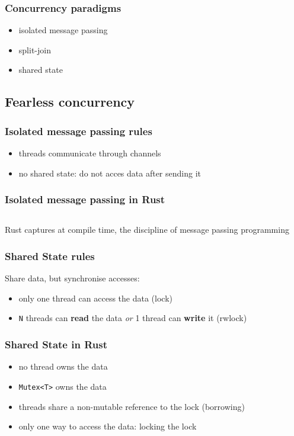 \documentclass{beamer}
\begin{document}
\begin{frame}
    \frametitle{Concurrency paradigms}
    \begin{itemize}
        \item isolated message passing
        \item split-join
        \item shared state
    \end{itemize}
\end{frame}

\subsection{Fearless concurrency}

\begin{frame}
    \frametitle{Isolated message passing rules}
    \begin{itemize}
        \item threads communicate through channels
        \item no shared state: do not acces data after sending it
    \end{itemize}
\end{frame}

\begin{frame}
    \frametitle{Isolated message passing in Rust}
    \inputminted[fontsize=\tiny]{rust}{code/isolated_message_passing.rs}
\end{frame}

\begin{frame}
    Rust captures at compile time, the discipline of message passing programming
\end{frame}

\begin{frame}
    \frametitle{Shared State rules}
    Share data, but synchronise accesses:
    \begin{itemize}
        \item only one thread can access the data (lock)
        \item \texttt{N} threads can \textbf{read} the data \textit{or} 1 thread can \textbf{write} it (rwlock)
    \end{itemize}
\end{frame}

\begin{frame}
    \frametitle{Shared State in Rust}
        \begin{itemize}
            \item no thread owns the data
            \item \texttt{Mutex<T>} owns the data
            \item threads share a non-mutable reference to the lock (borrowing)
            \item only one way to access the data: locking the lock
        \end{itemize}
        \vspace{1.5em}
        \inputminted{rust}{code/lock.rs}
\end{frame}
\end{document}
